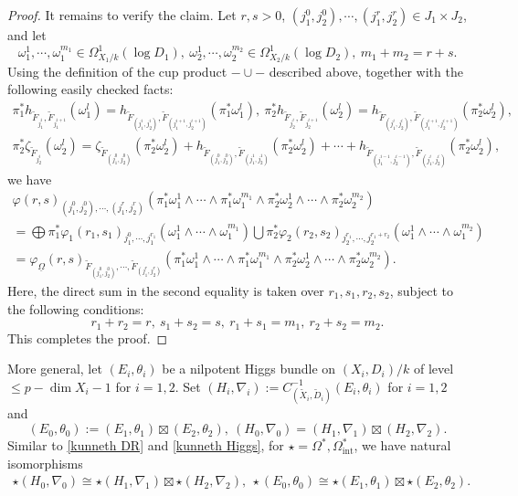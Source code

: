 \documentclass[12pt, a4paper]{article}
\begin{document}
\begin{proof}
It remains to verify the claim. Let $r,s>0$, $(j_1^0,j_2^0),\cdots,(j^r_1,j^r_2)\in J_1\times J_2$, and let
$$\omega_1^1,\cdots,\omega_1^{m_1}\in\Omega^1_{X_1/k}(\log D_1),~\omega_2^1,\cdots,\omega_2^{m_2}\in\Omega^1_{X_2/k}(\log D_2),~m_1+m_2=r+s.
$$
Using the definition of the cup product $-\cup-$ described above, together with the following easily checked facts:
$$
\begin{array}{c}
\pi_1^*h_{\tilde F_{j_1^i},\tilde F_{j_1^{i+1}}}(\omega_1^l)=h_{\tilde F_{(j_1^i,j_2^i)},\tilde F_{(j_1^{i+1},j_2^{i+1})}}(\pi^*_1\omega_1^l),~\pi_2^*h_{\tilde F_{j_2^i},\tilde F_{j_2^{i+1}}}(\omega_2^l)=h_{\tilde F_{(j_1^i,j_2^i)},\tilde F_{(j_1^{i+1},j_2^{i+1})}}(\pi^*_2\omega_2^l),\\
\pi_2^*\zeta_{\tilde F_{j_2^i}}(\omega_2^l)=\zeta_{\tilde F_{(j^0_1,j_2^0)}}(\pi_2^*\omega_2^l)+h_{\tilde F_{(j_1^0,j_2^0)},\tilde F_{(j_1^1,j_2^1)}}(\pi^*_2\omega_2^l)+\cdots+h_{\tilde F_{(j_1^{i-1},j_2^{i-1})},\tilde F_{(j_1^i,j_2^i)}}(\pi^*_2\omega_2^l),
\end{array}
$$
we have
$$
\begin{array}{c}
\varphi(r,s)_{(j_1^0,j_2^0),\cdots,(j_1^r,j_2^r)}(\pi_1^*\omega_1^1\wedge\cdots\wedge\pi_1^*\omega_1^{m_1}
\wedge\pi_2^*\omega_2^1\wedge\cdots\wedge\pi_2^*\omega_2^{m_2})\\
=\bigoplus\pi_1^*\varphi_1(r_1,s_1)_{j^0_1,\cdots,j^{r_1}_1}(\omega_1^1\wedge\cdots\wedge\omega_1^{m_1})\bigcup\pi_2^*\varphi_2(r_2,s_2)_{j^{r_1}_2,\cdots,j^{r_1+r_2}_2}(\omega_1^1\wedge\cdots\wedge\omega_1^{m_2})\\
=\varphi_{\underline\Omega}(r,s)_{\tilde F_{(j^0_1,j^0_2)},\cdots,\tilde F_{(j^r_1,j^r_2)}}(\pi_1^*\omega_1^1\wedge\cdots\wedge\pi_1^*\omega_1^{m_1}
\wedge\pi_2^*\omega_2^1\wedge\cdots\wedge\pi_2^*\omega_2^{m_2}).
\end{array}
$$
Here, the direct sum in the second equality is taken over $r_1,s_1,r_2,s_2$, subject to the following conditions:
$$
r_1+r_2=r,~s_1+s_2=s,~r_1+s_1=m_1,~r_2+s_2=m_2.
$$
This completes the proof.
\end{proof}
\iffalse
More general, let $(E_i,\theta_i)$ be a nilpotent Higgs bundle on $(X_i,D_i)/k$ of level $\leq p-\dim X_i-1$ for $i=1,2$. Set $(H_i,\nabla_i):=C^{-1}_{(\tilde X_i,\tilde D_i)}(E_i,\theta_i)$ for $i=1,2$ and
$$(E_0,\theta_0):=(E_1,\theta_1)\boxtimes(E_2,\theta_2),~(H_0,\nabla_0)=(H_1,\nabla_1)\boxtimes(H_2,\nabla_2).$$
Similar to \eqref{kunneth DR} and \eqref{kunneth Higgs}, for $\star=\Omega^*,\Omega^*_\mathrm{int}$, we have natural isomorphisms
\begin{eqnarray}\label{kunneth theta}
\star(H_0,\nabla_0)\cong\star(H_1,\nabla_1)\boxtimes\star(H_2,\nabla_2),~\star(E_0,\theta_0)\cong\star(E_1,\theta_1)\boxtimes\star(E_2,\theta_2).
\end{eqnarray}
\end{document}
